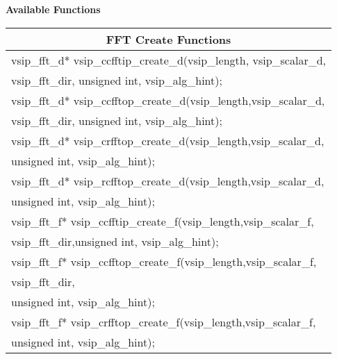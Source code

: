 \\\cvsiplh 
\\ \hspace*{.8cm} \vspace*{.1cm} \textbf{Available Functions }
\\ \hspace*{0.5cm} {
\ttfamily
\begin{tabular}[H]{|l|}
\multicolumn{1}{c}{\rmfamily \bfseries FFT Create Functions\vspace{.1cm}}\\ \hline
vsip\_fft\_d* vsip\_ccfftip\_create\_d(vsip\_length, vsip\_scalar\_d,\\*\hspace{.7cm}vsip\_fft\_dir, unsigned int, vsip\_alg\_hint);\\
vsip\_fft\_d* vsip\_ccfftop\_create\_d(vsip\_length,vsip\_scalar\_d,\\*\hspace{.7cm}vsip\_fft\_dir, unsigned int, vsip\_alg\_hint);\\
vsip\_fft\_d* vsip\_crfftop\_create\_d(vsip\_length,vsip\_scalar\_d,\\*\hspace{.7cm}unsigned int, vsip\_alg\_hint);\\
vsip\_fft\_d* vsip\_rcfftop\_create\_d(vsip\_length,vsip\_scalar\_d,\\*\hspace{.7cm}unsigned int, vsip\_alg\_hint);\\
vsip\_fft\_f* vsip\_ccfftip\_create\_f(vsip\_length,vsip\_scalar\_f,\\*\hspace{.7cm}vsip\_fft\_dir,unsigned int, vsip\_alg\_hint);\\
vsip\_fft\_f* vsip\_ccfftop\_create\_f(vsip\_length,vsip\_scalar\_f,\\*\hspace{.7cm}vsip\_fft\_dir,\\*\hspace{.7cm}unsigned int, vsip\_alg\_hint);\\
vsip\_fft\_f* vsip\_crfftop\_create\_f(vsip\_length,vsip\_scalar\_f,\\*\hspace{.7cm}unsigned int, vsip\_alg\_hint);\\

\end{tabular}}
